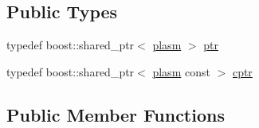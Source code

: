 \subsection*{Public Types}
\begin{DoxyCompactItemize}
\item 
typedef boost\+::shared\+\_\+ptr$<$ \hyperlink{structecto_1_1plasm}{plasm} $>$ \hyperlink{structecto_1_1plasm_a899b9da452ab35849f07038c90990ac3}{ptr}
\item 
typedef boost\+::shared\+\_\+ptr$<$ \hyperlink{structecto_1_1plasm}{plasm} const  $>$ \hyperlink{structecto_1_1plasm_afd3b9e2d4732023ab9e94553e0d66ac4}{cptr}
\end{DoxyCompactItemize}
\subsection*{Public Member Functions}
